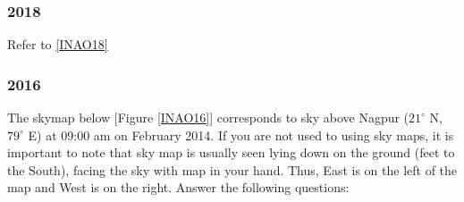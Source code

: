 \documentclass[a4paper,12pt]{extarticle}
\begin{document}
\subsubsection{2018}
Refer to \ref{INAO18}
\subsubsection{2016}

The skymap below [Figure \ref{INAO16}] corresponds to sky above Nagpur ($21^\circ$ N, $79^\circ$ E) at 09:00 am on  February 2014. If you are not used to using sky maps, it is important to note that sky map is usually seen lying down on the ground (feet to the South), facing the sky with map in your hand. Thus, East is on the left of the map and West is on the right. Answer the following questions:\\
\end{document}
